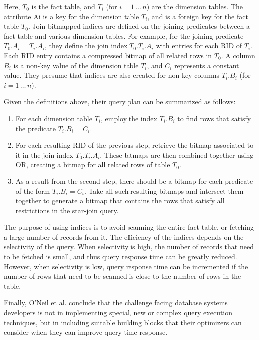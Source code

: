 \documentclass[12pt]{article}
\begin{document}
Here, $T_{0}$ is the fact table, and $T_i$ (for $i=1\,\ldots \, n$) are the dimension tables. The attribute Ai is a key for the
dimension table $T_{i}$, and is a foreign key for the fact table $T_{0}$. Join bitmapped indices are defined on the joining
predicates between a fact table and various dimension tables. For example, for the joining predicate $T_{0}.A_{i} =
T_{i}.A_{i}$, they define the join index $T_{0}.T_{i}.A_{i}$ with entries for each RID of $T_{i}$. Each RID entry contains a compressed bitmap
of all related rows in $T_0$. A column $B_i$ is a non-key value of the dimension table $T_i$, and $C_i$ represents a constant value. They
presume that indices are also created for non-key columns $T_{i}.B_{i}$ (for $i=1\,\ldots \, n$).

Given the definitions above, their query plan can be summarized as follows: 

\begin{enumerate}

	\item For each dimension table $T_i$, employ the index $T_i.B_i$ to find rows that satisfy the predicate $T_i.B_i = C_{i}$.

	\item For each resulting RID of the previous step, retrieve the bitmap associated to it in the join index $T_0.T_i.A_i$. These bitmaps are then combined together using OR, creating a bitmap for all related rows of table $T_0$.

	\item As a result from the second step, there should be a bitmap for each predicate of the form $T_i.B_i = C_i$. Take all such resulting bitmaps and intersect them together to generate a bitmap that contains the rows that satisfy all restrictions in the star-join query.

\end{enumerate}

The purpose of using indices is to avoid scanning the entire fact table, or fetching a large number of records from it. The
efficiency of the indices depends on the selectivity of the query. When selectivity is high, the number of records that need
to be fetched is small, and thus query response time can be greatly reduced. However, when selectivity is low, query response
time can be incremented if the number of rows that need to be scanned is close to the number of rows in the table.

Finally, O’Neil et al. conclude that the challenge facing database systems developers is not in implementing special, new or
complex query execution techniques, but in including suitable building blocks that their optimizers can consider when they can
improve query time response.
\end{document}
